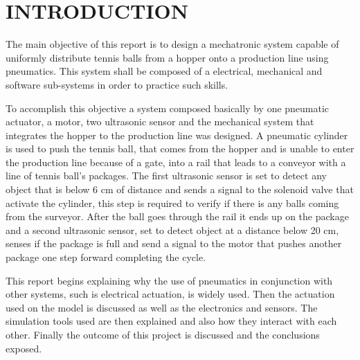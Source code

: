 \documentclass[transmag]{IEEEtran}
\begin{document}
\maketitle
\thispagestyle{empty}

\clearpage
\newpage

\clearpage\thispagestyle{empty}
\onecolumn

\tableofcontents


\lstlistoflistings

\clearpage
\newpage

\twocolumn







\section{INTRODUCTION}

 The main objective of this report is to design a mechatronic system capable of uniformly distribute tennis balls from a hopper onto a production line using pneumatics. This system shall be composed of a electrical, mechanical and software sub-systems in order to practice such skills.
 
 To accomplish this objective a system composed basically by one pneumatic actuator, a motor, two ultrasonic sensor and the mechanical system that integrates the hopper to the production line was designed.
 A pneumatic cylinder is used to push the tennis ball, that comes from the hopper and is unable to enter the production line because of a gate, into a rail that leads to a conveyor with a line of tennis ball's packages. 
 The first ultrasonic sensor is set to detect any object that is below 6 cm of distance and sends a signal to the solenoid valve that activate the cylinder, this step is required to verify if there is any balls coming from the surveyor.
 After the ball goes through the rail it ends up on the package and a second ultrasonic sensor, set to detect object at a distance below 20 cm, senses if the package is full and send a signal to the motor that pushes another package one step forward completing the cycle. 
 
 This report begins explaining why the use of pneumatics in conjunction with other systems, such is electrical actuation, is widely used. Then the actuation used on the model is discussed as well as the electronics and sensors. The simulation tools used are then explained and also how they interact with each other.
Finally the outcome of this project is discussed and the conclusions exposed.
\end{document}
